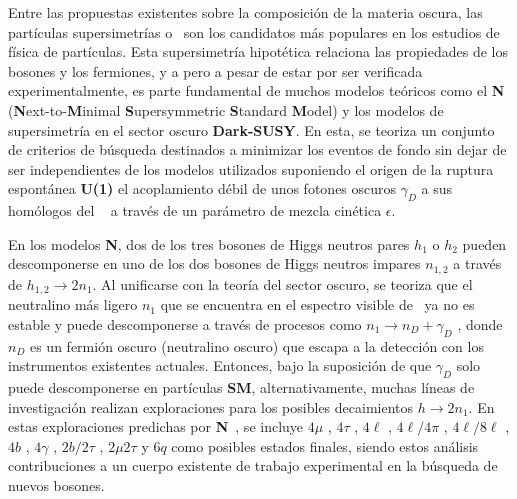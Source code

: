 Entre las propuestas existentes sobre la composición de la materia oscura, las partículas supersimetrías o \SUSY ~son los candidatos más populares en los estudios de física de partículas. Esta supersimetría hipotética relaciona las propiedades de los bosones y los fermiones, y a pero a pesar de estar por ser verificada experimentalmente, es parte fundamental de muchos modelos teóricos como el \textbf{N}\MSSM ~ (\textbf{N}ext-to-\textbf{M}inimal \textbf{S}upersymmetric \textbf{S}tandard \textbf{M}odel) y los modelos de supersimetría en el sector oscuro \textbf{Dark-SUSY}. En esta, se teoriza un conjunto de criterios de búsqueda destinados a minimizar los eventos de fondo sin dejar de ser independientes de los modelos utilizados suponiendo el origen de la ruptura espontánea \textbf{U(1)} el acoplamiento débil de unos fotones oscuros $\gamma_D$ a sus homólogos del \ME ~ a través de un parámetro de mezcla cinética $\epsilon$. %


En los modelos \textbf{N}\MSSM, dos de los tres bosones de Higgs neutros pares $h_1$ o $h_2$ pueden descomponerse en uno de los dos bosones de Higgs neutros impares $n_{1,2}$ a través de $h_{1,2} \rightarrow  2n_1$. Al unificarse con la teoría del sector oscuro, se teoriza que el neutralino más ligero $n_1$ que se encuentra en el espectro visible de \SUSY ~ya no es estable y puede descomponerse a través de procesos como $n_1  \rightarrow n_D + \gamma_D$ , donde $n_D$ es un fermión oscuro (neutralino oscuro) que escapa a la detección con los instrumentos existentes actuales. Entonces, bajo la suposición de que $\gamma_D$ solo puede descomponerse en partículas \textbf{SM}, alternativamente, muchas líneas de investigación realizan exploraciones para los posibles decaimientos $h \rightarrow 2n_1$. En estas exploraciones predichas por \textbf{N}\MSSM ~, se incluye $4\mu$ \citep{cms_collaboration_search_2016,cms_collaboration_search_2013}
, $4\tau$ %
, $4\ell$ \citep{cms_collaboration_search_2018,lhcb_collaboration_search_2016}
, $4\ell/4\pi$ \citep{cms_collaboration_search_2018-1}
, $4\ell/8\ell$ \citep{atlas_collaboration_search_2016-2}
, $4b$ \citep{atlas_collaboration_search_2018-1,atlas_collaboration_search_2016-3}
, $4\gamma$ \citep{atlas_collaboration_search_2014}
, $2b/2\tau$ \citep{atlas_collaboration_search_2018-2}
, $2\mu 2\tau$ \citep{atlas_collaboration_search_2015-1}
y $6q$ \citep{cms_collaboration_search_2016-2} 
como posibles estados finales, siendo estos análisis contribuciones a un cuerpo existente de trabajo experimental en la búsqueda de nuevos bosones.

